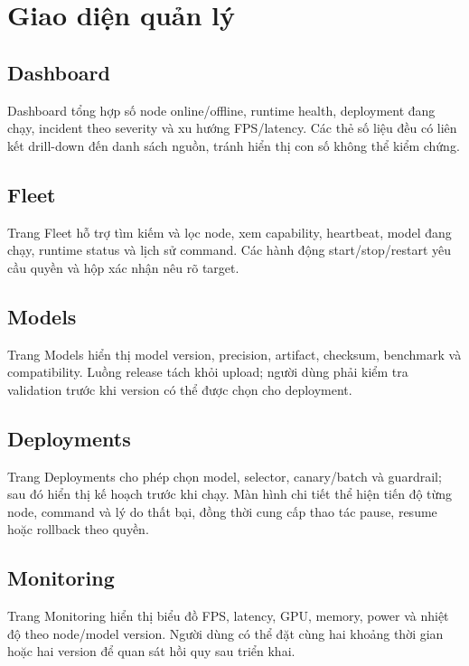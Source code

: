 \section{Giao diện quản lý}

\subsection{Dashboard}

Dashboard tổng hợp số node online/offline, runtime health, deployment đang chạy,
incident theo severity và xu hướng FPS/latency. Các thẻ số liệu đều có liên kết
drill-down đến danh sách nguồn, tránh hiển thị con số không thể kiểm chứng.

\subsection{Fleet}

Trang Fleet hỗ trợ tìm kiếm và lọc node, xem capability, heartbeat, model đang
chạy, runtime status và lịch sử command. Các hành động start/stop/restart yêu cầu
quyền và hộp xác nhận nêu rõ target.

\subsection{Models}

Trang Models hiển thị model version, precision, artifact, checksum, benchmark và
compatibility. Luồng release tách khỏi upload; người dùng phải kiểm tra validation
trước khi version có thể được chọn cho deployment.

\subsection{Deployments}

Trang Deployments cho phép chọn model, selector, canary/batch và guardrail; sau
đó hiển thị kế hoạch trước khi chạy. Màn hình chi tiết thể hiện tiến độ từng node,
command và lý do thất bại, đồng thời cung cấp thao tác pause, resume hoặc rollback
theo quyền.

\subsection{Monitoring}

Trang Monitoring hiển thị biểu đồ FPS, latency, GPU, memory, power và nhiệt độ
theo node/model version. Người dùng có thể đặt cùng hai khoảng thời gian hoặc hai
version để quan sát hồi quy sau triển khai.

